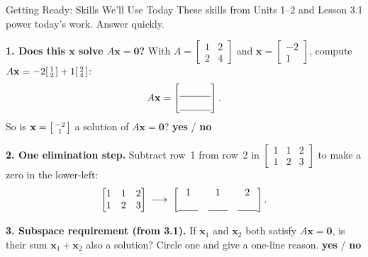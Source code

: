 \documentclass[10pt]{article}
\newcommand{\xx}{\mathbf{x}}
\newcommand{\zero}{\mathbf{0}}
\begin{document}
\namedateperiod

\vspace{0.12in}

\begin{notesbox}{Getting Ready: Skills We'll Use Today}
\small These skills from Units 1--2 and Lesson 3.1 power today's work. Answer quickly.

\vspace{4pt}
\textbf{1. Does this $\xx$ solve $A\xx=\zero$?} With $A=\begin{bmatrix} 1 & 2 \\ 2 & 4 \end{bmatrix}$
and $\xx=\begin{bmatrix} -2 \\ 1 \end{bmatrix}$, compute
$A\xx = -2\begin{bsmallmatrix} 1\\2 \end{bsmallmatrix}+1\begin{bsmallmatrix} 2\\4 \end{bsmallmatrix}$:
\[
  A\xx = \begin{bmatrix}\rule{0pt}{1.1em}\blank{1.1cm}\\[2pt]\blank{1.1cm}\end{bmatrix}.
\]
So is $\xx=\begin{bsmallmatrix} -2\\1 \end{bsmallmatrix}$ a solution of $A\xx=\zero$? \; \textbf{yes} \quad / \quad \textbf{no}

\vspace{4pt}
\textbf{2. One elimination step.} Subtract row~1 from row~2 in
$\begin{bmatrix} 1 & 1 & 2 \\ 1 & 2 & 3 \end{bmatrix}$ to make a zero in the lower-left:
\[
  \begin{bmatrix} 1 & 1 & 2 \\ 1 & 2 & 3 \end{bmatrix}
  \;\longrightarrow\;
  \begin{bmatrix} 1 & 1 & 2 \\[2pt] \blank{0.7cm} & \blank{0.7cm} & \blank{0.7cm} \end{bmatrix}.
\]

\vspace{4pt}
\textbf{3. Subspace requirement (from 3.1).} If $\xx_1$ and $\xx_2$ both satisfy $A\xx=\zero$, is
their sum $\xx_1+\xx_2$ also a solution? Circle one and give a one-line reason. \quad \textbf{yes} / \textbf{no}
\writeline
\end{notesbox}
\end{document}
